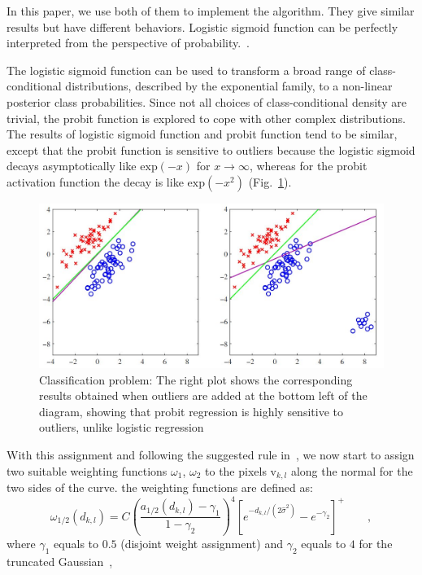 \documentclass[conference]{IEEEtran}
\begin{document}
In this paper, we use both of them to implement the algorithm. They give
similar results but have different behaviors. Logistic sigmoid function
can be perfectly interpreted from the perspective of
probability.~\cite{bishop2006pattern}.

The logistic sigmoid function can be used to transform a broad range
of class-conditional distributions, described by the exponential
family, to a non-linear posterior class probabilities. Since not all choices of
class-conditional density are trivial, the probit function is explored
to cope with other complex distributions. The results of logistic
sigmoid function and probit function tend to be similar, except that the
probit function is sensitive to outliers because the logistic sigmoid
decays asymptotically like $\mathrm{exp}(-x)$ for $x \rightarrow \infty$, whereas
for the probit activation function the decay is like
$\mathrm{exp}(-x^2)$ (Fig.~\ref{fig:outliers}).
\begin{figure} 
  \includegraphics[width=\columnwidth]{images/outliers.jpg}
\caption{Classification problem: The
  right plot shows the corresponding results obtained when outliers
  are added at the bottom left of the diagram, showing  that probit
  regression is highly sensitive to outliers, unlike logistic
  regression~\cite{bishop2006pattern}}
\label{fig:outliers}
\end{figure}

With this assignment and following the suggested rule in~\cite{hanek2004contracting}, we now start to assign two suitable weighting functions
$\omega_1$, $\omega_2$ to the pixels $\mathrm{v}_{k,l}$ along the
normal for the two sides of the curve. the weighting functions are
defined as:
\begin{equation}
  \label{eq:weight}
  \omega_{1/2}(d_{k,l}) = C\left(\frac{a_{1/2}(d_{k,l}) -
    \gamma_1}{1-\gamma_2}\right)^4 \left[e^{-d_{k,l}/(2\hat{\sigma}^2)} - e^{-\gamma_2}\right]^+\qquad,
\end{equation}
where $\gamma_1$ equals to $0.5$ (disjoint weight assignment) and $\gamma_2$
equals to $4$ for the truncated Gaussian~\cite{hanek2004contracting},
\end{document}
